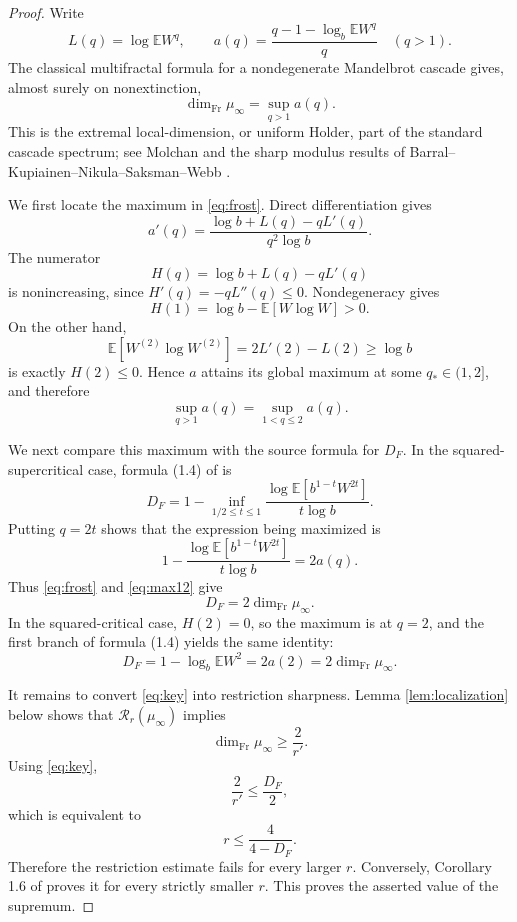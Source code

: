 \documentclass[11pt]{article}
\newcommand{\E}{\mathbb E}
\newcommand{\muinf}{\mu_\infty}
\begin{document}
\begin{proof}
Write
\[
 L(q)=\log \E W^q,\qquad
 a(q)=\frac{q-1-\log_b\E W^q}{q}
 \quad(q>1).
\]
The classical multifractal formula for a nondegenerate Mandelbrot cascade
gives, almost surely on nonextinction,
\begin{equation}\label{eq:frost}
 \dim_{\mathrm{Fr}}\muinf=\sup_{q>1}a(q).
\end{equation}
This is the extremal local-dimension, or uniform Holder, part of the standard
cascade spectrum; see Molchan \cite{Molchan} and the sharp modulus results of
Barral--Kupiainen--Nikula--Saksman--Webb \cite{BKNSW}.

We first locate the maximum in \eqref{eq:frost}.  Direct differentiation gives
\[
 a'(q)=
 \frac{\log b+L(q)-qL'(q)}{q^2\log b}.
\]
The numerator
\[
 H(q)=\log b+L(q)-qL'(q)
\]
is nonincreasing, since \(H'(q)=-qL''(q)\leq0\).  Nondegeneracy gives
\[
 H(1)=\log b-\E[W\log W]>0.
\]
On the other hand,
\[
 \E[W^{(2)}\log W^{(2)}]
 =2L'(2)-L(2)\geq\log b
\]
is exactly \(H(2)\leq0\).  Hence \(a\) attains its global maximum at some
\(q_*\in(1,2]\), and therefore
\begin{equation}\label{eq:max12}
 \sup_{q>1}a(q)=\sup_{1<q\leq2}a(q).
\end{equation}

We next compare this maximum with the source formula for \(D_F\).  In the
squared-supercritical case, formula (1.4) of \cite{CHQW} is
\[
 D_F
 =1-\inf_{1/2\leq t\leq1}
 \frac{\log\E[b^{1-t}W^{2t}]}{t\log b}.
\]
Putting \(q=2t\) shows that the expression being maximized is
\[
 1-\frac{\log\E[b^{1-t}W^{2t}]}{t\log b}
 =2a(q).
\]
Thus \eqref{eq:frost} and \eqref{eq:max12} give
\begin{equation}\label{eq:key}
 D_F=2\dim_{\mathrm{Fr}}\muinf.
\end{equation}
In the squared-critical case, \(H(2)=0\), so the maximum is at \(q=2\), and
the first branch of formula (1.4) yields the same identity:
\[
 D_F=1-\log_b\E W^2=2a(2)
 =2\dim_{\mathrm{Fr}}\muinf.
\]

It remains to convert \eqref{eq:key} into restriction sharpness.  Lemma
\ref{lem:localization} below shows that \(\mathcal R_r(\muinf)\) implies
\[
 \dim_{\mathrm{Fr}}\muinf\geq\frac{2}{r'}.
\]
Using \eqref{eq:key},
\[
 \frac{2}{r'}\leq\frac{D_F}{2},
\]
which is equivalent to
\[
 r\leq\frac{4}{4-D_F}.
\]
Therefore the restriction estimate fails for every larger \(r\).
Conversely, Corollary 1.6 of \cite{CHQW} proves it for every strictly smaller
\(r\).  This proves the asserted value of the supremum.
\end{proof}
\end{document}
